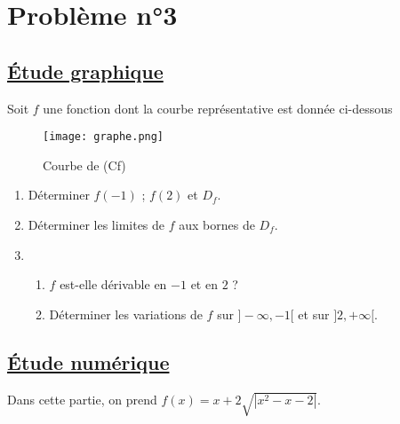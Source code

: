 \documentclass[12pt]{article}
\begin{document}
\section*{Problème n°3}

\subsection*{\underline{Étude graphique}}
Soit $f$ une fonction dont la courbe représentative est donnée ci-dessous
\begin{figure}[H]%
\centering
\texttt{[image: graphe.png]}
\caption{Courbe de (Cf)}
\label{fig:monimage}
\end{figure}
\begin{enumerate}
    \item Déterminer $f(-1)$ ; $f(2)$ et $D_f$.
    \item Déterminer les limites de $f$ aux bornes de $D_f$.
    \item 
    \begin{enumerate}
        \item $f$ est-elle dérivable en $-1$ et en $2$ ?
        \item Déterminer les variations de $f$ sur $]-\infty, -1[$ et sur $]2, +\infty[$.
    \end{enumerate}
\end{enumerate}

\subsection*{\underline{Étude numérique}}

Dans cette partie, on prend $f(x) = x + 2\sqrt{|x^2 - x - 2|}$.
\end{document}
